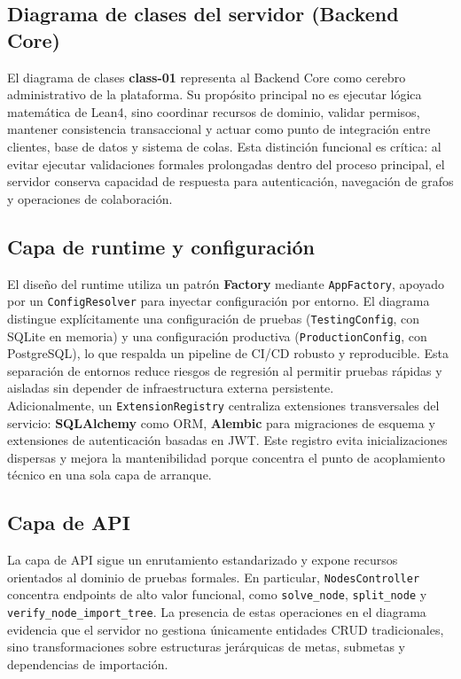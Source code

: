 \documentclass[12pt, letterpaper]{article}
\begin{document}
\subsection{Diagrama de clases del servidor (Backend Core)}

El diagrama de clases \textbf{class-01} representa al Backend Core como cerebro administrativo de la plataforma. Su propósito principal no es ejecutar lógica matemática de Lean4, sino coordinar recursos de dominio, validar permisos, mantener consistencia transaccional y actuar como punto de integración entre clientes, base de datos y sistema de colas. Esta distinción funcional es crítica: al evitar ejecutar validaciones formales prolongadas dentro del proceso principal, el servidor conserva capacidad de respuesta para autenticación, navegación de grafos y operaciones de colaboración.

\subsection{Capa de runtime y configuración}

El diseño del runtime utiliza un patrón \textbf{Factory} mediante \texttt{AppFactory}, apoyado por un \texttt{ConfigResolver} para inyectar configuración por entorno. El diagrama distingue explícitamente una configuración de pruebas (\texttt{TestingConfig}, con SQLite en memoria) y una configuración productiva (\texttt{ProductionConfig}, con PostgreSQL), lo que respalda un pipeline de CI/CD robusto y reproducible. Esta separación de entornos reduce riesgos de regresión al permitir pruebas rápidas y aisladas sin depender de infraestructura externa persistente.\\

Adicionalmente, un \texttt{ExtensionRegistry} centraliza extensiones transversales del servicio: \textbf{SQLAlchemy} como ORM, \textbf{Alembic} para migraciones de esquema y extensiones de autenticación basadas en JWT. Este registro evita inicializaciones dispersas y mejora la mantenibilidad porque concentra el punto de acoplamiento técnico en una sola capa de arranque.

\subsection{Capa de API}

La capa de API sigue un enrutamiento estandarizado y expone recursos orientados al dominio de pruebas formales. En particular, \texttt{NodesController} concentra endpoints de alto valor funcional, como \texttt{solve\_node}, \texttt{split\_node} y \texttt{verify\_node\_import\_tree}. La presencia de estas operaciones en el diagrama evidencia que el servidor no gestiona únicamente entidades CRUD tradicionales, sino transformaciones sobre estructuras jerárquicas de metas, submetas y dependencias de importación.\\
\end{document}
